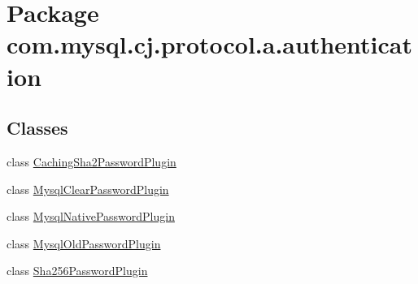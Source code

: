 \hypertarget{namespacecom_1_1mysql_1_1cj_1_1protocol_1_1a_1_1authentication}{}\section{Package com.\+mysql.\+cj.\+protocol.\+a.\+authentication}
\label{namespacecom_1_1mysql_1_1cj_1_1protocol_1_1a_1_1authentication}
\subsection*{Classes}
\begin{DoxyCompactItemize}
\item 
class \mbox{\hyperlink{classcom_1_1mysql_1_1cj_1_1protocol_1_1a_1_1authentication_1_1_caching_sha2_password_plugin}{Caching\+Sha2\+Password\+Plugin}}
\item 
class \mbox{\hyperlink{classcom_1_1mysql_1_1cj_1_1protocol_1_1a_1_1authentication_1_1_mysql_clear_password_plugin}{Mysql\+Clear\+Password\+Plugin}}
\item 
class \mbox{\hyperlink{classcom_1_1mysql_1_1cj_1_1protocol_1_1a_1_1authentication_1_1_mysql_native_password_plugin}{Mysql\+Native\+Password\+Plugin}}
\item 
class \mbox{\hyperlink{classcom_1_1mysql_1_1cj_1_1protocol_1_1a_1_1authentication_1_1_mysql_old_password_plugin}{Mysql\+Old\+Password\+Plugin}}
\item 
class \mbox{\hyperlink{classcom_1_1mysql_1_1cj_1_1protocol_1_1a_1_1authentication_1_1_sha256_password_plugin}{Sha256\+Password\+Plugin}}
\end{DoxyCompactItemize}
